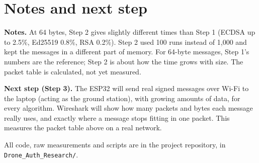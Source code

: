 \documentclass[10pt,a4paper]{article}
\begin{document}
\section{Notes and next step}

\textbf{Notes.} At 64 bytes, Step 2 gives slightly different times than Step 1 (ECDSA up to
2.5\%, Ed25519 0.8\%, RSA 0.2\%). Step 2 used 100 runs instead of 1,000 and kept the messages
in a different part of memory. For 64-byte messages, Step 1's numbers are the reference; Step 2
is about how the time grows with size. The packet table is calculated, not yet measured.

\textbf{Next step (Step 3).} The ESP32 will send real signed messages over Wi-Fi to the laptop
(acting as the ground station), with growing amounts of data, for every algorithm. Wireshark
will show how many packets and bytes each message really uses, and exactly where a message stops
fitting in one packet. This measures the packet table above on a real network.

All code, raw measurements and scripts are in the project repository, in
\texttt{Drone\_Auth\_Research/}.
\end{document}

